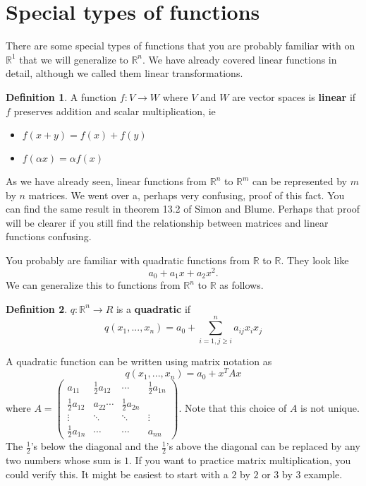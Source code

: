 \documentclass[12pt,reqno]{amsart}
\theoremstyle{definition}
\newtheorem{definition}{Definition}[section]
\def\R{\mathbb{R}}
\renewcommand{\to}{{\rightarrow}}
\begin{document}
\newpage

\section{Special types of functions}

There are some special types of functions that you are probably
familiar with on $\R^1$ that we will generalize to $\R^n$. We have
already covered linear functions in detail, although we called them
linear transformations.
\begin{definition}
  A function $f:V \to W$ where $V$ and $W$ are vector spaces is
  \textbf{linear} if $f$ preserves addition and scalar multiplication, ie
  \begin{itemize}
  \item $f(x+y) = f(x) + f(y)$
  \item $f(\alpha x) = \alpha f(x)$
  \end{itemize}
\end{definition}
As we have already seen, linear functions from $\R^n$ to $\R^m$ can be
represented by $m$ by $n$ matrices. We went over a, perhaps very
confusing, proof of this fact. You can find the same result in theorem
13.2 of Simon and Blume. Perhaps that proof will be clearer if you
still find the relationship between matrices and linear functions
confusing. 

You probably are familiar with quadratic functions from $\R$ to
$\R$. They look like
\[ a_0 + a_1 x + a_2 x^2. \]
We can generalize this to functions from $\R^n$ to $\R$ as follows.
\begin{definition}
  $q:\R^n \to R$ is a \textbf{quadratic} if 
  \[ q(x_1, ..., x_n) = a_0 + \sum_{i=1, j \geq i}^n a_{ij} x_i x_j \]
\end{definition}
A quadratic function can be written using matrix notation as
\[ q(x_1,..., x_n) = a_0 + x^T A x \]
where $A = \begin{pmatrix} a_{11} & \frac{1}{2} a_{12} & \cdots &
  \frac{1}{2} a_{1n} \\
  \frac{1}{2} a_{12} & a_{22} \cdots & \frac{1}{2} a_{2n} \\
  \vdots & \ddots & \ddots & \vdots \\
  \frac{1}{2} a_{1n} & \cdots & \cdots & a_{nn}
\end{pmatrix}$. Note that this choice of $A$ is not unique. The
$\frac{1}{2}$'s below the diagonal and the $\frac{1}{2}$'s above the
diagonal can be replaced by any two numbers whose sum is $1$. If you
want to practice matrix multiplication, you could verify this. It
might be easiest to start with a $2$ by $2$ or $3$ by $3$ example. 
\end{document}
